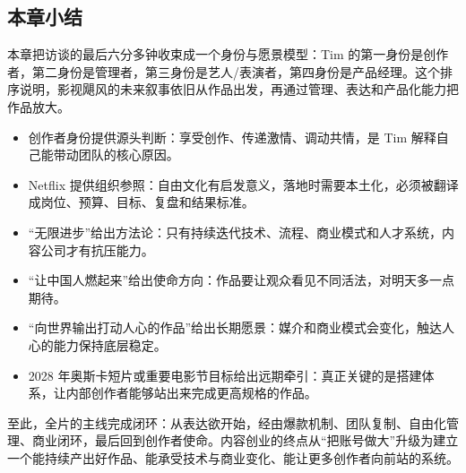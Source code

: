 \subsection{本章小结}

本章把访谈的最后六分多钟收束成一个身份与愿景模型：Tim 的第一身份是创作者，第二身份是管理者，第三身份是艺人/表演者，第四身份是产品经理。这个排序说明，影视飓风的未来叙事依旧从作品出发，再通过管理、表达和产品化能力把作品放大。

\begin{itemize}
  \item 创作者身份提供源头判断：享受创作、传递激情、调动共情，是 Tim 解释自己能带动团队的核心原因。
  \item Netflix 提供组织参照：自由文化有启发意义，落地时需要本土化，必须被翻译成岗位、预算、目标、复盘和结果标准。
  \item “无限进步”给出方法论：只有持续迭代技术、流程、商业模式和人才系统，内容公司才有抗压能力。
  \item “让中国人燃起来”给出使命方向：作品要让观众看见不同活法，对明天多一点期待。
  \item “向世界输出打动人心的作品”给出长期愿景：媒介和商业模式会变化，触达人心的能力保持底层稳定。
  \item 2028 年奥斯卡短片或重要电影节目标给出远期牵引：真正关键的是搭建体系，让内部创作者能够站出来完成更高规格的作品。
\end{itemize}

至此，全片的主线完成闭环：从表达欲开始，经由爆款机制、团队复制、自由化管理、商业闭环，最后回到创作者使命。内容创业的终点从“把账号做大”升级为建立一个能持续产出好作品、能承受技术与商业变化、能让更多创作者向前站的系统。
